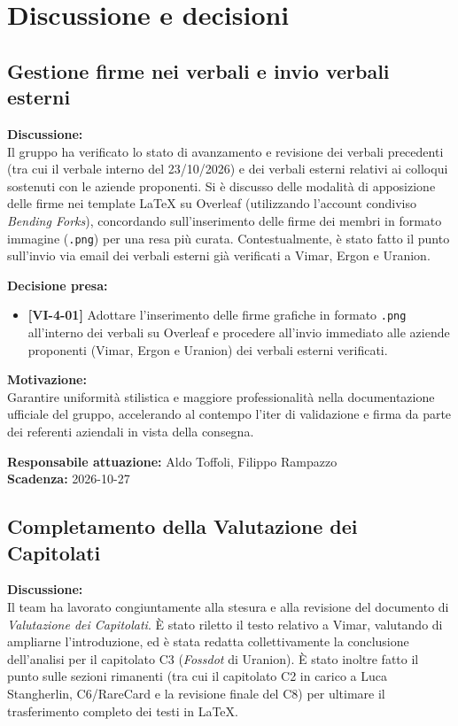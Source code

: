 \documentclass[12pt,a4paper]{article}
\newcommand{\tightlist}{\setlength{\itemsep}{1pt}\setlength{\parskip}{0pt}}
\begin{document}
\newpage
\hypertarget{discussione-e-decisioni}{%
\section{Discussione e decisioni}}

\hypertarget{argomento-1}{%
\subsection{Gestione firme nei verbali e invio verbali esterni}}

\textbf{Discussione:} \\
Il gruppo ha verificato lo stato di avanzamento e revisione dei verbali precedenti (tra cui il verbale interno del 23/10/2026) e dei verbali esterni relativi ai colloqui sostenuti con le aziende proponenti. Si è discusso delle modalità di apposizione delle firme nei template \LaTeX{} su Overleaf (utilizzando l'account condiviso \emph{Bending Forks}), concordando sull'inserimento delle firme dei membri in formato immagine (\texttt{.png}) per una resa più curata. Contestualmente, è stato fatto il punto sull'invio via email dei verbali esterni già verificati a Vimar, Ergon e Uranion.

\textbf{Decisione presa:}
\begin{itemize}
\tightlist
\item[$\checkmark$] \textbf{[VI-4-01]} Adottare l'inserimento delle firme grafiche in formato \texttt{.png} all'interno dei verbali su Overleaf e procedere all'invio immediato alle aziende proponenti (Vimar, Ergon e Uranion) dei verbali esterni verificati.
\end{itemize}

\textbf{Motivazione:} \\
Garantire uniformità stilistica e maggiore professionalità nella documentazione ufficiale del gruppo, accelerando al contempo l'iter di validazione e firma da parte dei referenti aziendali in vista della consegna.

\textbf{Responsabile attuazione:} Aldo Toffoli, Filippo Rampazzo \\
\textbf{Scadenza:} 2026-10-27

\hypertarget{argomento-2}{%
\subsection{Completamento della Valutazione dei Capitolati}}

\textbf{Discussione:} \\
Il team ha lavorato congiuntamente alla stesura e alla revisione del documento di \emph{Valutazione dei Capitolati}. È stato riletto il testo relativo a Vimar, valutando di ampliarne l'introduzione, ed è stata redatta collettivamente la conclusione dell'analisi per il capitolato C3 (\emph{Fossdot} di Uranion). È stato inoltre fatto il punto sulle sezioni rimanenti (tra cui il capitolato C2 in carico a Luca Stangherlin, C6/RareCard e la revisione finale del C8) per ultimare il trasferimento completo dei testi in \LaTeX{}.
\end{document}
